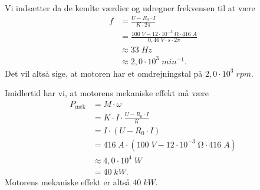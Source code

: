 \documentclass{report}
\begin{document}
Vi indsætter da de kendte værdier og udregner frekvensen til at være
\begin{equation*}
\begin{split}
  f &=\frac{U-R_0 \cdot I}{K \cdot 2 \pi }\\
  &=\frac{100 \;\unit{V} - 12 \cdot 10 ^{-3} \;\unit{\ohm} \cdot 416 \;\unit{A} }{0,46 \;\unit{V \cdot s} \cdot 2 \pi }\\
  &\approx 33 \;\unit{Hz}\\
  &\approx 2,0 \cdot 10^3 \;\unit{min ^{-1}}.
\end{split}
\end{equation*}
Det vil altså sige, at motoren har et omdrejningstal på $2,0 \cdot 10^3 \;\unit{rpm}$.

Imidlertid har vi, at motorens mekaniske effekt må være
\begin{equation*}
\begin{split}
  P _{\text{mek} }&=M \cdot \omega \\
  &=K \cdot I \cdot \frac{U-R_0 \cdot I}{K}\\
  &=I \cdot \left(U-R_0 \cdot I\right) \\
  &=416 \;\unit{A} \cdot \left(100 \;\unit{V} - 12 \cdot 10 ^{-3} \;\unit{\ohm} \cdot 416 \;\unit{A} \right) \\
  &\approx 4,0 \cdot 10^4 \;\unit{W} \\
  &=40 \;\unit{kW}.
\end{split}
\end{equation*}
Motorens mekaniske effekt er altså $40 \;\unit{kW} $.
\end{document}
